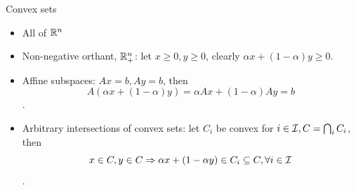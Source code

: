 \documentclass[notes]{beamer}
\begin{document}
\begin{frame}{Convex sets}
	\begin{example}
		\begin{itemize}
			\item All of ${\mathbb{R}}^n$
			\item Non-negative orthant, ${\mathbb{R}}_+^n$: let $x \ge 0, y\ge 0$, clearly $\alpha x + (1-\alpha) y \ge 0$.
			\item Affine subspaces: $Ax=b, Ay=b$, then
			      $$A(\alpha x+(1-\alpha) y)=\alpha Ax + (1-\alpha)Ay = b$$.
			\item Arbitrary intersections of convex sets: let $C_i$ be convex for $i\in \mathcal{I}, C = \bigcap_i C_i$, then
			      $$x\in C,y\in C \Rightarrow \alpha x +(1-\alpha y) \in C_i \subseteq C, \forall i \in \mathcal{I} $$.
		\end{itemize}
	\end{example}
\end{frame}
\end{document}
